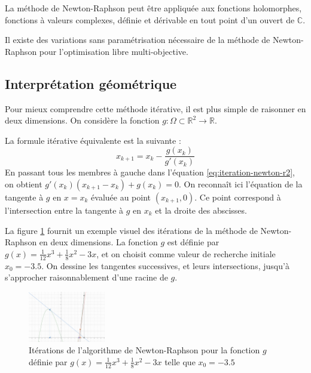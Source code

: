 \documentclass[3p, twocolumn]{elsarticle}
\begin{document}
\begin{rmk}
    La méthode de Newton-Raphson peut être appliquée aux fonctions holomorphes, fonctions à valeurs complexes, définie et dérivable en tout point d'un ouvert de $\mathbb{C}$.
\end{rmk}
\begin{rmk}
    Il existe des variations sans paramétrisation nécessaire de la méthode de Newton-Raphson pour l'optimisation libre multi-objective. \cite{art:Fliege_Drummond_Svaiter_2009}
\end{rmk}
\subsection{Interprétation géométrique}
Pour mieux comprendre cette méthode itérative, il est plus simple de raisonner en deux dimensions. On considère la fonction $g :\Omega\subset\mathbb R^2 \rightarrow \mathbb R$.

La formule itérative équivalente est la suivante :
\begin{equation}
    x_{k+1}=x_k-\frac{g(x_k)}{g'(x_k)}
    \label{eq:iteration-newton-r2}
\end{equation}
En passant tous les membres à gauche dans l'équation \ref{eq:iteration-newton-r2}, on obtient $g'(x_k)(x_{k+1}-x_k)+g(x_k)=0$. On reconnaît ici l'équation de la tangente à $g$ en $x=x_k$ évaluée au point $(x_{k+1},0)$.
Ce point correspond à l'intersection entre la tangente à $g$ en $x_k$ et la droite des abscisses.

La figure \ref{fig:nr-iterations-1} fournit un exemple visuel des itérations de la méthode de Newton-Raphson en deux dimensions. La fonction $g$ est définie par $g(x)=\frac{1}{12}x^3+\frac18x^2-3x$, et on choisit comme valeur de recherche initiale $x_0=-3.5$. On dessine les tangentes successives, et leurs intersections, jusqu'à s'approcher raisonnablement d'une racine de $g$.

\begin{figure}[htbp]
    \centering
    \includegraphics[width = 0.3\textwidth]{iteration-newton-1.png}
    \caption{Itérations de l'algorithme de Newton-Raphson pour la fonction $g$ définie par $g(x)=\frac{1}{12}x^3+\frac18x^2-3x$ telle que $x_0=-3.5$}
    \label{fig:nr-iterations-1}
\end{figure}
\end{document}
